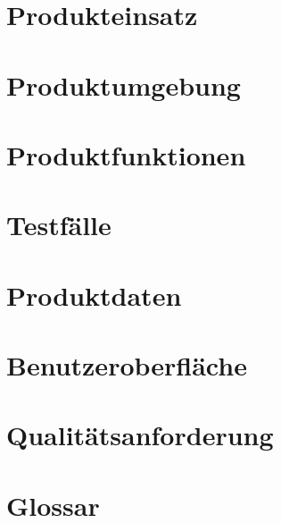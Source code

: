 \documentclass{report}
\begin{document}
	\chapter{Produkteinsatz}\label{chp:produkteinsatz}
	
		
	\chapter{Produktumgebung}\label{chp:produktumgebung}
	
	

	\chapter{Produktfunktionen}\label{chp:produktfunktionen}
	

	\chapter{Testfälle}\label{chp:testfaelle}
	
	
	\chapter{Produktdaten}\label{chp:produktdaten}
	
	
	\chapter{Benutzeroberfläche}\label{chp:benutzeroberflaeche}
	
	
	\chapter{Qualitätsanforderung}\label{chp:qualitaetsanforderung}
	
	
	\chapter{Glossar}\label{chp:glossar}
	
	
	
	
\end{document}
